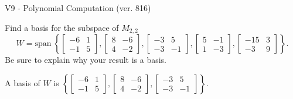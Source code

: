 \begin{exercise}
  \begin{exerciseTitle}V9 - Polynomial Computation (ver. 816)\end{exerciseTitle}
  \begin{exerciseStatement}
    Find a basis for the subspace of \(M_{2,2}\) 
\[W=\mathrm{span}\ \left\{\left[\begin{array}{cc}
-6 & 1 \\
-1 & 5
\end{array}\right] , \left[\begin{array}{cc}
8 & -6 \\
4 & -2
\end{array}\right] , \left[\begin{array}{cc}
-3 & 5 \\
-3 & -1
\end{array}\right] , \left[\begin{array}{cc}
5 & -1 \\
1 & -3
\end{array}\right] , \left[\begin{array}{cc}
-15 & 3 \\
-3 & 9
\end{array}\right]\right\}.\]
 Be sure to explain why your result is a basis.


  \end{exerciseStatement}
  \begin{exerciseAnswer}
   A basis of \(W\) is  \(\left\{\left[\begin{array}{cc}
-6 & 1 \\
-1 & 5
\end{array}\right] , \left[\begin{array}{cc}
8 & -6 \\
4 & -2
\end{array}\right] , \left[\begin{array}{cc}
-3 & 5 \\
-3 & -1
\end{array}\right]\right\}\).
  


  \end{exerciseAnswer}
\end{exercise}